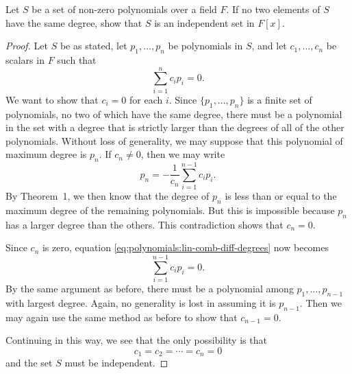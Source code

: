 Let $S$ be a set of non-zero polynomials over a field
$F$. If no two elements of $S$ have the same degree, show that $S$ is
an independent set in $F[x]$.
\begin{proof}
  Let $S$ be as stated, let $p_1,\dots,p_n$ be polynomials in $S$, and
  let $c_1,\dots,c_n$ be scalars in $F$ such that
  \begin{equation}
    \label{eq:polynomials:lin-comb-diff-degrees}
    \sum_{i=1}^nc_ip_i = 0.
  \end{equation}
  We want to show that $c_i = 0$ for each $i$. Since
  $\{p_1, \dots, p_n\}$ is a finite set of polynomials, no two of
  which have the same degree, there must be a polynomial in the set
  with a degree that is strictly larger than the degrees of all of the
  other polynomials. Without loss of generality, we may suppose that
  this polynomial of maximum degree is $p_n$. If $c_n\neq0$, then we
  may write
  \begin{equation*}
    p_n = -\frac1{c_n}\sum_{i=1}^{n-1}c_ip_i.
  \end{equation*}
  By Theorem~1, we then know that the degree of $p_n$ is less than or
  equal to the maximum degree of the remaining polynomials. But this
  is impossible because $p_n$ has a larger degree than
  the others. This contradiction shows that $c_n = 0$.

  Since $c_n$ is zero, equation
  \eqref{eq:polynomials:lin-comb-diff-degrees} now becomes
  \begin{equation*}
    \sum_{i=1}^{n-1}c_ip_i = 0.
  \end{equation*}
  By the same argument as before, there must be a polynomial among
  $p_1,\dots,p_{n-1}$ with largest degree. Again, no generality is
  lost in assuming it is $p_{n-1}$. Then we may again use the same
  method as before to show that $c_{n-1} = 0$.

  Continuing in this way, we see that the only possibility is that
  \begin{equation*}
    c_1 = c_2 = \cdots = c_n = 0
  \end{equation*}
  and the set $S$ must be independent.
\end{proof}

